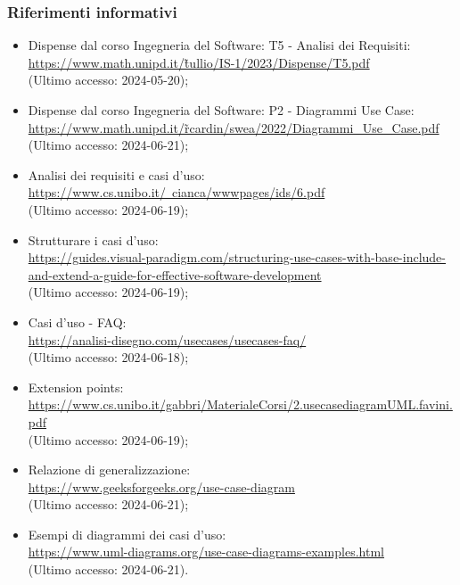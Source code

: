 \subsubsection{Riferimenti informativi}
\begin{itemize}
  \item Dispense dal corso Ingegneria del Software: T5 - Analisi dei Requisiti:\\ \href{https://www.math.unipd.it/~tullio/IS-1/2023/Dispense/T5.pdf}{https://www.math.unipd.it/\~tullio/IS-1/2023/Dispense/T5.pdf}  \\ (Ultimo accesso: 2024-05-20);
  \item Dispense dal corso Ingegneria del Software: P2 - Diagrammi Use Case:\\ \href{https://www.math.unipd.it/~rcardin/swea/2022/Diagrammi%20Use%20Case.pdf}{https://www.math.unipd.it/\~rcardin/swea/2022/Diagrammi\_Use\_Case.pdf}  \\ (Ultimo accesso: 2024-06-21);
  \item Analisi dei requisiti e casi d'uso:\\ \href{https://www.cs.unibo.it/~cianca/wwwpages/ids/6.pdf}{https://www.cs.unibo.it/~cianca/wwwpages/ids/6.pdf}  \\ (Ultimo accesso: 2024-06-19);
  \item Strutturare i casi d'uso:\\ \href{https://guides.visual-paradigm.com/structuring-use-cases-with-base-include-and-extend-a-guide-for-effective-software-development}{https://guides.visual-paradigm.com/structuring-use-cases-with-base-include-and-extend-a-guide-for-effective-software-development}  \\ (Ultimo accesso: 2024-06-19);
  \item Casi d'uso - FAQ:\\ \href{https://analisi-disegno.com/usecases/usecases-faq}{https://analisi-disegno.com/usecases/usecases-faq/}  \\ (Ultimo accesso: 2024-06-18);
  \item Extension points:\\ \href{https://www.cs.unibo.it/gabbri/MaterialeCorsi/2.usecasediagramUML.favini.pdf}{https://www.cs.unibo.it/gabbri/MaterialeCorsi/2.usecasediagramUML.favini.pdf}  \\ (Ultimo accesso: 2024-06-19);
  \item Relazione di generalizzazione:\\ \href{https://www.geeksforgeeks.org/use-case-diagram}{https://www.geeksforgeeks.org/use-case-diagram}  \\ (Ultimo accesso: 2024-06-21);
  \item Esempi di diagrammi dei casi d'uso:\\ \href{https://www.uml-diagrams.org/use-case-diagrams-examples.html}{https://www.uml-diagrams.org/use-case-diagrams-examples.html}  \\ (Ultimo accesso: 2024-06-21).
\end{itemize}
